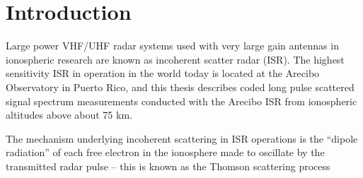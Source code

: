 \chapter{Introduction}
Large power VHF/UHF radar systems used with very large gain antennas in ionospheric research are known as incoherent scatter radar (ISR). The highest sensitivity ISR in operation in the world today is located at the Arecibo Observatory in Puerto Rico, and this thesis describes coded long pulse scattered signal spectrum measurements conducted with the Arecibo ISR from ionospheric altitudes above about 75 km.

The mechanism underlying incoherent scattering in ISR operations is the ``dipole radiation'' of each free electron in the ionosphere made to oscillate by the transmitted radar pulse -- this is known as the Thomson scattering process